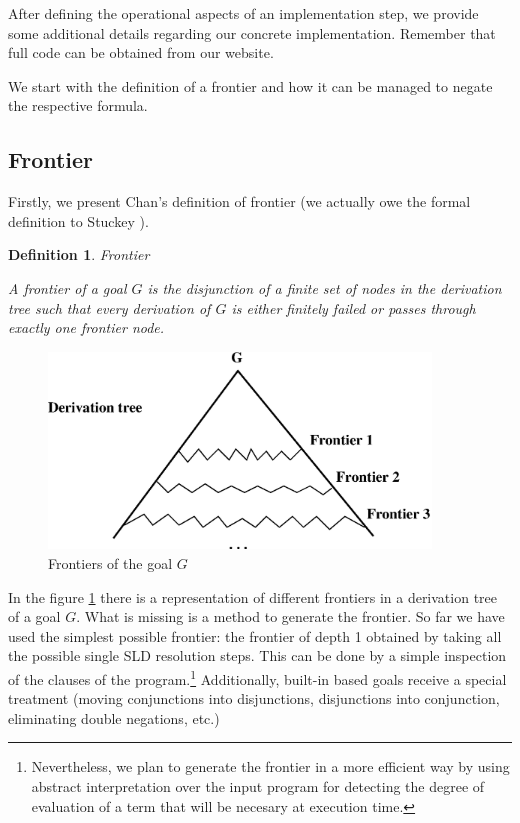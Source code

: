 \documentclass{tlp}
\newtheorem{definition}{Definition} %
\newcommand{\naf}{{\em naf}}\newcommand{\viejo}[1]{}
\begin{document}


After defining the operational aspects of an implementation step, we
provide some additional details regarding our concrete
implementation. Remember that full code can be obtained from our
website.

We start with the definition of a frontier and how it can be managed
to negate the respective formula.


\subsection{Frontier}
\label{frontier}

Firstly, we present Chan's definition of frontier (we actually owe the formal
definition to Stuckey \cite{Stuckey95}).

\begin{definition}{\em Frontier}

A frontier of a goal $G$ is the disjunction of a finite set of nodes
in the derivation tree such that every derivation of $G$ is either
finitely failed or passes through exactly one {\em frontier node}.
\end{definition}

  \begin{figure}
        \centering
        \includegraphics[width=4in]{tree_frontier.eps} 
        \caption{Frontiers of the goal $G$}
        \label{fig:tree_frontier}
  \end{figure}

In the figure \ref{fig:tree_frontier} there is a representation of different
frontiers in a derivation tree of a goal $G$. What is missing is a method to
generate the frontier. So far we have used the simplest possible frontier: the
frontier of depth 1 obtained by taking all the possible single SLD resolution
steps. This can be done by a simple inspection of the clauses of the
program.\footnote{Nevertheless, we plan to generate the frontier in a more
efficient way by using abstract interpretation over the input program for
detecting the degree of evaluation of a term that will be necesary at
execution time.} Additionally, built-in based goals receive a special
treatment (moving conjunctions into disjunctions, disjunctions into
conjunction, eliminating double negations, etc.)
\end{document}
